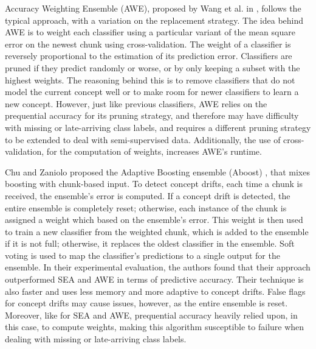 Accuracy Weighting Ensemble (AWE), proposed by Wang et al. in \cite{wang2003mining}, follows the typical approach, with a variation on the replacement strategy. The idea behind AWE is to weight each classifier using a particular variant of the mean square error on the newest chunk using cross-validation. The weight of a classifier is reversely proportional to the estimation of its prediction error. Classifiers are pruned if they predict randomly or worse, or by only keeping a subset with the highest weights. The reasoning behind this is to remove classifiers that do not model the current concept well or to make room for newer classifiers to learn a new concept. However, just like previous classifiers, AWE relies on the prequential accuracy for its pruning strategy, and therefore may have difficulty with missing or late-arriving class labels, and requires a different pruning strategy to be extended to deal with semi-supervised data. Additionally, the use of cross-validation, for the computation of weights, increases AWE's runtime.

Chu and Zaniolo proposed the Adaptive Boosting ensemble (Aboost) \cite{wang2003mining}, that mixes boosting with chunk-based input. To detect concept drifts, each time a chunk is received, the ensemble's error is computed. If a concept drift is detected, the entire ensemble is completely reset; otherwise, each instance of the chunk is assigned a weight which based on the ensemble's error. This weight is then used to train a new classifier from the weighted chunk, which is added to the ensemble if it is not full; otherwise, it replaces the oldest classifier in the ensemble. Soft voting is used to map the classifier's predictions to a single output for the ensemble. In their experimental evaluation, the authors found that their approach outperformed SEA \cite{street2001streaming} and AWE \cite{wang2003mining} in terms of predictive accuracy. Their technique is also faster and uses less memory and more adaptive to concept drifts. False flags for concept drifts may cause issues, however, as the entire ensemble is reset. Moreover, like for SEA and AWE, prequential accuracy heavily relied upon, in this case, to compute weights, making this algorithm susceptible to failure when dealing with missing or late-arriving class labels.


